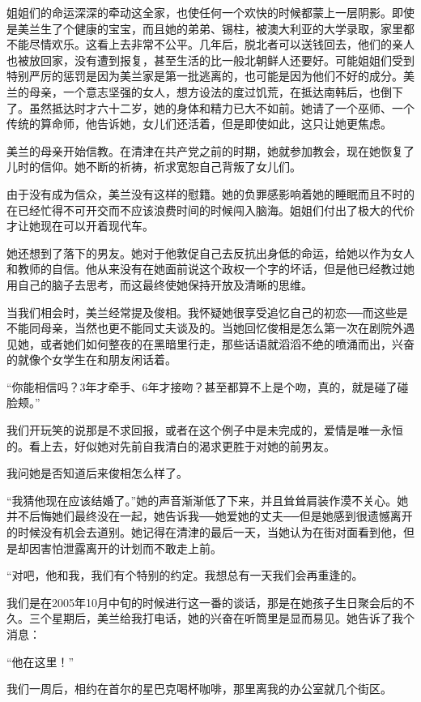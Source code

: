 姐姐们的命运深深的牵动这全家，也使任何一个欢快的时候都蒙上一层阴影。即使是美兰生了个健康的宝宝，而且她的弟弟、锡柱，被澳大利亚的大学录取，家里都不能尽情欢乐。这看上去非常不公平。几年后，脱北者可以送钱回去，他们的亲人也被放回家，没有遭到报复，甚至生活的比一般北朝鲜人还要好。可能姐姐们受到特别严厉的惩罚是因为美兰家是第一批逃离的，也可能是因为他们不好的成分。美兰的母亲，一个意志坚强的女人，想方设法的度过饥荒，在抵达南韩后，也倒下了。虽然抵达时才六十二岁，她的身体和精力已大不如前。她请了一个巫师、一个传统的算命师，他告诉她，女儿们还活着，但是即使如此，这只让她更焦虑。

美兰的母亲开始信教。在清津在共产党之前的时期，她就参加教会，现在她恢复了儿时的信仰。她不断的祈祷，祈求宽恕自己背叛了女儿们。

由于没有成为信众，美兰没有这样的慰籍。她的负罪感影响着她的睡眠而且不时的在已经忙得不可开交而不应该浪费时间的时候闯入脑海。姐姐们付出了极大的代价才让她现在可以开着现代车。

她还想到了落下的男友。她对于他敦促自己去反抗出身低的命运，给她以作为女人和教师的自信。他从来没有在她面前说这个政权一个字的坏话，但是他已经教过她用自己的脑子去思考，而这最终使她保持开放及清晰的思维。

当我们相会时，美兰经常提及俊相。我怀疑她很享受追忆自己的初恋──而这些是不能同母亲，当然也更不能同丈夫谈及的。当她回忆俊相是怎么第一次在剧院外遇见她，或者她们如何整夜的在黑暗里行走，那些话语就滔滔不绝的喷涌而出，兴奋的就像个女学生在和朋友闲话着。

“你能相信吗？3年才牵手、6年才接吻？甚至都算不上是个吻，真的，就是碰了碰脸颊。”

我们开玩笑的说那是不求回报，或者在这个例子中是未完成的，爱情是唯一永恒的。看上去，好似她对先前自我清白的渴求更胜于对她的前男友。

我问她是否知道后来俊相怎么样了。

“我猜他现在应该结婚了。”她的声音渐渐低了下来，并且耸耸肩装作漠不关心。她并不后悔她们最终没在一起，她告诉我──她爱她的丈夫──但是她感到很遗憾离开的时候没有机会去道别。她记得在清津的最后一天，当她认为在街对面看到他，但是却因害怕泄露离开的计划而不敢走上前。

“对吧，他和我，我们有个特别的约定。我想总有一天我们会再重逢的。

我们是在2005年10月中旬的时候进行这一番的谈话，那是在她孩子生日聚会后的不久。三个星期后，美兰给我打电话，她的兴奋在听筒里是显而易见。她告诉了我个消息：

“他在这里！”

我们一周后，相约在首尔的星巴克喝杯咖啡，那里离我的办公室就几个街区。

